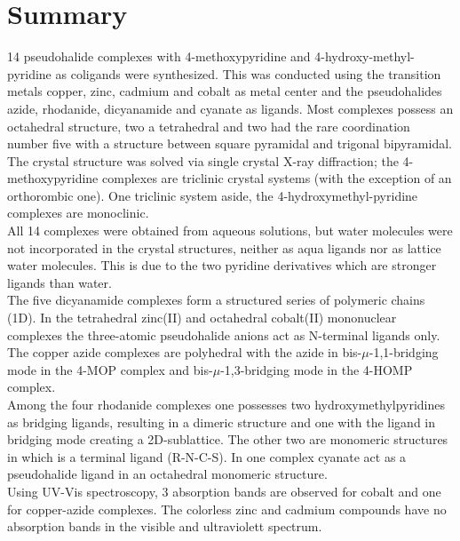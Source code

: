 \chapter{Summary}

14 pseudohalide complexes with 4-methoxypyridine and 4-hydroxy-methyl-pyridine as coligands were synthesized. This was conducted using the transition metals copper, zinc, cadmium and cobalt as metal center and the pseudohalides azide, rhodanide, dicyanamide and cyanate as ligands. Most  complexes possess an octahedral structure, two a tetrahedral and two had the rare coordination number five with a structure between square pyramidal and trigonal bipyramidal.\\ 

The crystal structure was solved via single crystal X-ray diffraction; the 4-methoxypyridine complexes are triclinic crystal systems (with the exception of an orthorombic one). One triclinic system aside, the 4-hydroxymethyl-pyridine complexes are monoclinic.\\

All 14 complexes were obtained from aqueous solutions, but water molecules  were not incorporated in the crystal structures, neither as aqua ligands nor as lattice water molecules. This is due to the two pyridine derivatives which are stronger ligands than water.\\

The five dicyanamide complexes form a structured series of polymeric chains (1D). In the tetrahedral zinc(II) and octahedral cobalt(II) mononuclear complexes the three-atomic pseudohalide anions  act as N-terminal ligands only. The copper azide complexes are polyhedral with the azide in bis-$\mu$-1,1-bridging mode  in the 4-MOP complex and bis-$\mu$-1,3-bridging mode in the 4-HOMP complex. \\

Among the four rhodanide complexes one possesses two hydroxymethylpyridines as bridging ligands, resulting in a dimeric structure and one with the  ligand in bridging mode creating a 2D-sublattice. The other two are monomeric structures in which   is a terminal ligand (R-N-C-S). In one complex cyanate act as a pseudohalide ligand in an octahedral monomeric structure.\\

 Using UV-Vis spectroscopy, 3 absorption bands are observed for cobalt and one for copper-azide complexes. The colorless zinc and cadmium compounds  have no absorption bands in the visible and ultraviolett spectrum.\\ 


